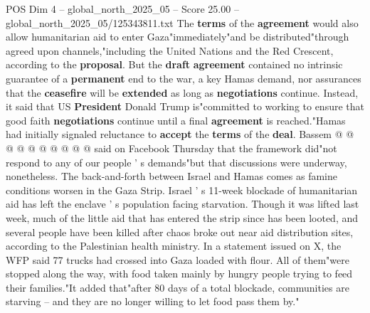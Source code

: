 \begin{textsample}{POS Dim 4 – global\_north\_2025\_05 – Score 25.00 – global\_north\_2025\_05/125343811.txt}
The \textbf{terms} of the \textbf{agreement} would also allow humanitarian aid to enter Gaza"immediately"and be distributed"through agreed upon channels,"including the United Nations and the Red Crescent, according to the \textbf{proposal}.
But the \textbf{draft} \textbf{agreement} contained no intrinsic guarantee of a \textbf{permanent} end to the war, a key Hamas demand, nor assurances that the \textbf{ceasefire} will be \textbf{extended} as long as \textbf{negotiations} continue.
Instead, it said that US \textbf{President} Donald Trump is"committed to working to ensure that good faith \textbf{negotiations} continue until a final \textbf{agreement} is reached."Hamas had initially signaled reluctance to \textbf{accept} the \textbf{terms} of the \textbf{deal}.
Bassem @ @ @ @ @ @ @ @ @ @ said on Facebook Thursday that the framework did"not respond to any of our people ' s demands"but that discussions were underway, nonetheless.
The back-and-forth between Israel and Hamas comes as famine conditions worsen in the Gaza Strip.
Israel ' s 11-week blockade of humanitarian aid has left the enclave ' s population facing starvation.
Though it was lifted last week, much of the little aid that has entered the strip since has been looted, and several people have been killed after chaos broke out near aid distribution sites, according to the Palestinian health ministry.
In a statement issued on X, the WFP said 77 trucks had crossed into Gaza loaded with flour.
All of them"were stopped along the way, with food taken mainly by hungry people trying to feed their families."It added that"after 80 days of a total blockade, communities are starving -- and they are no longer willing to let food pass them by."

\end{textsample}
